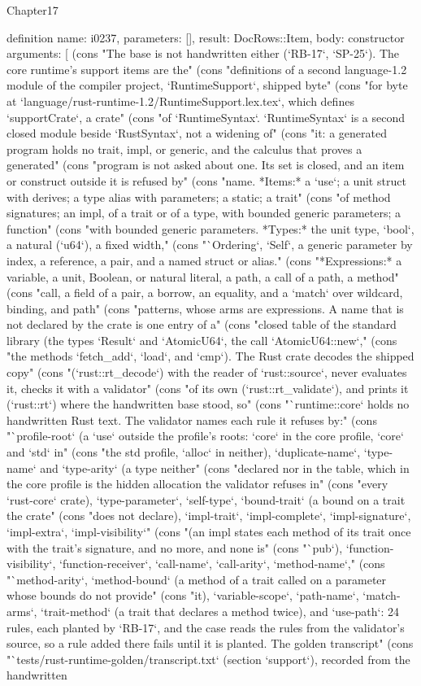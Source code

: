 \begin{lexlean}{Chapter17}
\begin{semanticmodule}
definition{
  name: i0237,
  parameters: [],
  result: DocRows::Item,
  body: constructor{
    arguments: [
      (cons "The base is not handwritten either (`RB-17`, `SP-25`). The core runtime's support items are the" (cons "definitions of a second language-1.2 module of the compiler project, `RuntimeSupport`, shipped byte" (cons "for byte at `language/rust-runtime-1.2/RuntimeSupport.lex.tex`, which defines `supportCrate`, a crate" (cons "of `RuntimeSyntax`. `RuntimeSyntax` is a second closed module beside `RustSyntax`, not a widening of" (cons "it: a generated program holds no trait, impl, or generic, and the calculus that proves a generated" (cons "program is not asked about one. Its set is closed, and an item or construct outside it is refused by" (cons "name. *Items:* a `use`; a unit struct with derives; a type alias with parameters; a static; a trait" (cons "of method signatures; an impl, of a trait or of a type, with bounded generic parameters; a function" (cons "with bounded generic parameters. *Types:* the unit type, `bool`, a natural (`u64`), a fixed width," (cons "`Ordering`, `Self`, a generic parameter by index, a reference, a pair, and a named struct or alias." (cons "*Expressions:* a variable, a unit, Boolean, or natural literal, a path, a call of a path, a method" (cons "call, a field of a pair, a borrow, an equality, and a `match` over wildcard, binding, and path" (cons "patterns, whose arms are expressions. A name that is not declared by the crate is one entry of a" (cons "closed table of the standard library (the types `Result` and `AtomicU64`, the call `AtomicU64::new`," (cons "the methods `fetch_add`, `load`, and `cmp`). The Rust crate decodes the shipped copy" (cons "(`rust::rt_decode`) with the reader of `rust::source`, never evaluates it, checks it with a validator" (cons "of its own (`rust::rt_validate`), and prints it (`rust::rt`) where the handwritten base stood, so" (cons "`runtime::core` holds no handwritten Rust text. The validator names each rule it refuses by:" (cons "`profile-root` (a `use` outside the profile's roots: `core` in the core profile, `core` and `std` in" (cons "the std profile, `alloc` in neither), `duplicate-name`, `type-name` and `type-arity` (a type neither" (cons "declared nor in the table, which in the core profile is the hidden allocation the validator refuses in" (cons "every `rust-core` crate), `type-parameter`, `self-type`, `bound-trait` (a bound on a trait the crate" (cons "does not declare), `impl-trait`, `impl-complete`, `impl-signature`, `impl-extra`, `impl-visibility`" (cons "(an impl states each method of its trait once with the trait's signature, and no more, and none is" (cons "`pub`), `function-visibility`, `function-receiver`, `call-name`, `call-arity`, `method-name`," (cons "`method-arity`, `method-bound` (a method of a trait called on a parameter whose bounds do not provide" (cons "it), `variable-scope`, `path-name`, `match-arms`, `trait-method` (a trait that declares a method twice), and `use-path`: 24 rules, each planted by `RB-17`, and the case reads the rules from the validator's source, so a rule added there fails until it is planted. The golden transcript" (cons "`tests/rust-runtime-golden/transcript.txt` (section `support`), recorded from the handwritten }}
\end{semanticmodule}
\end{lexlean}
